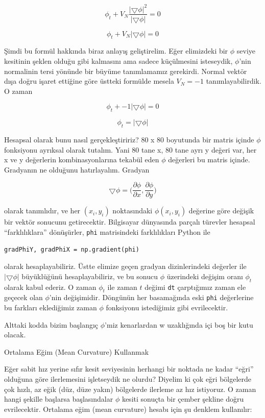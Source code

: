 \documentclass[12pt,fleqn]{article}\usepackage{../../common}
\begin{document}
$$ \phi_t + V_N\frac{|\bigtriangledown\phi|^2}{|\bigtriangledown\phi|} = 0  $$

$$ \phi_t + V_N |\bigtriangledown\phi| = 0  $$

Şimdi bu formül hakkında biraz anlayış geliştirelim. Eğer elimizdeki
bir $\phi$ seviye kesitinin şeklen olduğu gibi kalmasını ama sadece
küçülmesini isteseydik, $\phi$'nin normalinin tersi yönünde bir büyüme
tanımlamamız gerekirdi. Normal vektör dışa doğru işaret ettiğine göre
üstteki formülde mesela $V_N = -1$ tanımlayabilirdik. O zaman

$$ \phi_t + -1 |\bigtriangledown\phi| = 0 $$

$$ \phi_t = |\bigtriangledown\phi|   $$

Hesapsal olarak bunu nasıl gerçekleştiririz? 80 x 80 boyutunda bir
matris içinde $\phi$ fonksiyonu ayrıksal olarak tutalım. Yani 80 tane
x, 80 tane ayrı y değeri var, her x ve y değerlerin kombinasyonlarına
tekabül eden $\phi$ değerleri bu matris içinde. Gradyanın ne olduğunu
hatırlayalım. Gradyan

$$ 
\bigtriangledown \phi = \bigg(
\frac{\partial \phi}{\partial x},
\frac{\partial \phi}{\partial y} \bigg)
$$

olarak tanımlıdır, ve her $(x_i,y_i)$ noktasındaki $\phi(x_i,y_i)$
değerine göre değişik bir vektör sonucunu getirecektir. Bilgisayar
dünyasında parçalı türevler hesapsal ``farklılıklara'' dönüşürler,
\verb!phi! matrisindeki farklılıkları Python ile

\begin{verbatim}
gradPhiY, gradPhiX = np.gradient(phi)
\end{verbatim}

olarak hesaplayabiliriz. Üstte elimize geçen gradyan dizinlerindeki
değerler ile $|\bigtriangledown\phi|$ büyüklüğünü hesaplayabiliriz, ve bu
sonucu $\phi$ üzerindeki değişim oranı $\phi_t$ olarak kabul ederiz. O
zaman $\phi_t$ ile zaman $t$ değimi \verb!dt! çarptığımız zaman ele geçecek
olan $\phi$'nin değişimidir. Döngünün her basamağında eski \verb!phi!
değerlerine bu farkları eklediğimiz zaman $\phi$ fonksiyonu istediğimiz
gibi evrilecektir.

Alttaki kodda bizim başlangıç $\phi$'miz kenarlardan w uzaklığında içi boş
bir kutu olacak. 

Ortalama Eğim (Mean Curvature) Kullanmak

Eğer sabit hız yerine sıfır kesit seviyesinin herhangi bir noktada ne kadar
``eğri'' olduğuna göre ilerlemesini işletseydik ne olurdu?  Diyelim ki çok
eğri bölgelerde çok hızlı, az eğik (düz, düze yakın) bölgelerde ilerleme az
hız istiyoruz. O zaman hangi şekille başlarsa başlasındalar $\phi$ kesiti
sonuçta bir çember şekline doğru evrilecektir. Ortalama eğim (mean
curvature) hesabı için şu denklem kullanılır:
\end{document}
